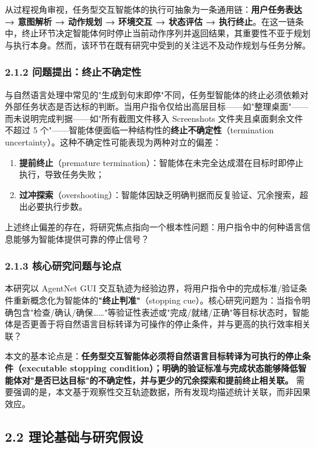 \documentclass[12pt,a4paper,openany,oneside]{ctexrep}
\begin{document}
从过程视角审视，任务型交互智能体的执行可抽象为一条通用链：\textbf{用户任务表达 → 意图解析 → 动作规划 → 环境交互 → 状态评估 → 执行终止}。在这一链条中，终止环节决定智能体何时停止当前动作序列并返回结果，其重要性不亚于规划与执行本身。然而，该环节在既有研究中受到的关注远不及动作规划与任务分解。

\subsubsection{2.1.2 问题提出：终止不确定性}


与自然语言处理中常见的"生成到句末即停"不同，任务型智能体的终止必须依赖对外部任务状态是否达标的判断。当用户指令仅给出高层目标——如"整理桌面"——而未说明完成判据——如"所有截图文件移入 Screenshots 文件夹且桌面剩余文件不超过 5 个"——智能体便面临一种结构性的\textbf{终止不确定性}（termination uncertainty）。这种不确定性可能表现为两种对立的偏差：

\begin{enumerate}
\item[1.] \textbf{提前终止}（premature termination）：智能体在未完全达成潜在目标时即停止执行，导致任务失败；
\item[2.] \textbf{过冲探索}（overshooting）：智能体因缺乏明确判据而反复验证、冗余搜索，超出必要执行步数。
\end{enumerate}


上述终止偏差的存在，将研究焦点指向一个根本性问题：用户指令中的何种语言信息能够为智能体提供可靠的停止信号？

\subsubsection{2.1.3 核心研究问题与论点}


本研究以 AgentNet GUI 交互轨迹为经验边界，将用户指令中的完成标准/验证条件重新概念化为智能体的\textbf{"终止判准"}（stopping cue）。核心研究问题为：当指令明确包含"检查/确认/确保……"等验证性表述或"完成/就绪/正确"等目标状态时，智能体是否更善于将自然语言目标转译为可操作的停止条件，并与更高的执行效率相关联？

本文的基本论点是：\textbf{任务型交互智能体必须将自然语言目标转译为可执行的停止条件（executable stopping condition）；明确的验证标准与完成状态能够降低智能体对"是否已达目标"的不确定性，并与更少的冗余探索和提前终止相关联。} 需要强调的是，本文基于观察性交互轨迹数据，所有发现均描述统计关联，而非因果效应。

\subsection{2.2 理论基础与研究假设}
\end{document}
